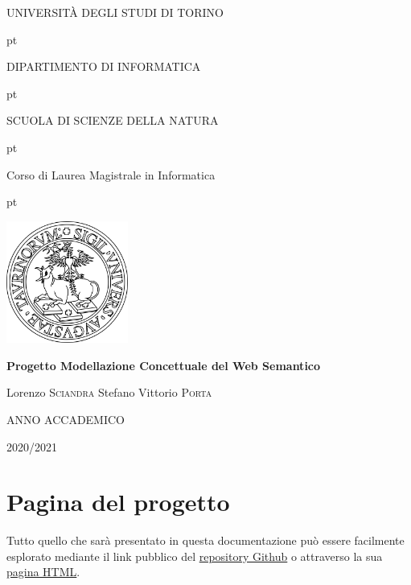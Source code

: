 \documentclass[12pt]{article}
\begin{document}
\begin{titlepage}

\thispagestyle{empty}

\centerline {\Large{\MakeUppercase{ Università DEGLI STUDI DI TORINO}}}
 pt

\centerline {\Large{\textsc DIPARTIMENTO DI INFORMATICA}}

 pt

\centerline {{\textsc SCUOLA DI SCIENZE DELLA NATURA}}

 pt

\centerline {\Large{\textsc Corso di Laurea Magistrale in Informatica}}

 pt


\centerline {\includegraphics[width=4cm]{files/Unito-logo.png}}

\vskip 2cm

\centerline {\Large {\bf Progetto Modellazione Concettuale del Web Semantico}}

\vskip 1.7cm

\noindent Lorenzo \textsc{Sciandra}
\hfill  {Stefano Vittorio \textsc{Porta}}



\vskip 2.7cm


\centerline{ANNO ACCADEMICO}
\vskip 0.1cm
\centerline{2020/2021}

\end{titlepage}

\section{Pagina del progetto}
Tutto quello che sarà presentato in questa documentazione può essere facilmente esplorato mediante il link pubblico del \href{https://github.com/LorenzoSciandra/ProgettoModSem}{repository Github} o attraverso la sua \href{https://lorenzosciandra.github.io/ProgettoModSem/}{pagina HTML}.  
\end{document}
